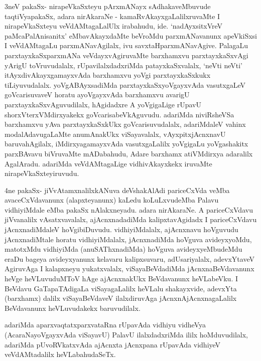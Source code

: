 \begin{artha}
3neV pakaSx- nirapeVkaSxteyu pArxmANayx sAdhakaveMbuvude taqtiVyapakaSx,
adara nirAkaraNe - kamaRvAkayxgaLalilxruvaMte I nirapeVkaSxteyu
veVdAMtagaLalUlx irabahudu, ide. `nadAyxsitxVreV paMcaPalAnisanitx' eMbavAkayxdaMte beVroMdu
parxmANavanunx apeVkiSxsi I veVdAMtagaLu parxmANavAgilalx, ivu
savxtaHparxmANavAgive. PalagaLu parxtayxkaSxparxmANa veVdayxvAgiruvaMte
barxhamxvu parxtayxkaSxvAgi yArigU toVruvudalalx, rUpavilalxdadxriMda
patayxkaSxvalalx, `neVti neVti' itAyxdivAkayxgamayxvAda barxhamxvu
yoVgi parxtayxkaSxkukx tiLiyuvudalalx. yoVgABAyxsadiMda
parxtayxkaSxyoVgayxvAda vasutxgaLeV goVcarisuvaveV horatu
ayoVgayxvAda barxhamxvu avarigU parxtayxkaSxvAguvudilalx, hAgidadxre
A yoVgigaLige rUpavU shorxVterxVMdirxyakekx
goVcarisabeVkAguvudu. adariMda niviRsheVSa barxhamxvu yAva
parxtayxkaSxkUkx goVcarisuvudalalx, adariMdaleV vahinx
modalAdavugaLaMte anumAnakUkx viSayavalalx, vAyxpitxjAcnxnavU
 baruvahAgilalx, iMdirxyagamayxvAda vasutxgaLalilx yoVgigaLu
yoVgashakitx parxBAvavu biVruvaMte mADabahudu, Adare barxhamx
atiVMdirxya adaralilx AgalAradu.  adariMda veVdAMtagaLige
vidhivAkayxkekx iruvaMte nirapeVkaSxteyiruvudu.
\end{artha}

\begin{artha}
4ne pakaSx- jiVvAtamxnalilxkANuva deVshakAlAdi pariceCxVda veMba
avaceCxVdavanunx (alapxteyanunx) kaLedu koLuLxvudeMba Palavu
vidhiyiMdale eMba pakaSx nAlakxneyadu. adara
nirAkaraNe. A pariceCxVdavu jiVvanalilx vAsatxvavalalx, ajAcnxnadadiMda
kalipxtavAgidadx I pariceCxVdavu jAcnxnadiMdaleV
hoVgibiDuvudu. vidhiyiMdalalx, ajAcnxnavu	hoVguvudu jAcnxnadiMtale
horatu vidhiyiMdalalx, jAcnxnadiMda hoVguva avideyxyoMdu, matotxMdu
vidhiyiMda (anuSAThxnadiMda) hoVguva avideyxyeMbudeMdu eraDu bageya
avideyxyanunx kelavaru kalipxsuvaru, adUsariyalalx, adevxYtaveV
AgiruvAga I kalapxneyu yukatxvalalx, viSayaBeVdadiMda
jAcnxnaBeVdavanunx heVge heVLuvuduMToV hAge ajAcnxnakUkx BeVdavanunx
heVLabeVku. I BeVdavu GaTapaTAdigaLa viSayagaLalilx heVLalu
shakayxvide, adevxYta (barxhamx) dalilx viSayaBeVdaveV ilalxdiruvAga
jAcnxnA\s jAcnxnagaLalilx BeVdavanunx heVLuvudakekx baruvudilalx.

adariMda aparxvaqtatxparxvataRna rUpavAda vidhiyu vidheVya
(AcaraNayoVgayxvAda viSayavU) PalavU ilalxdadxriMda ililx
hoMduvudilalx, adariMda pUvoRVkatxvAda ajAcnxta jAcnxpana rUpavAda
vidhiyeV veVdAMtadalilx heVLabahudaSeTx.
\end{artha}

\centerline{}

